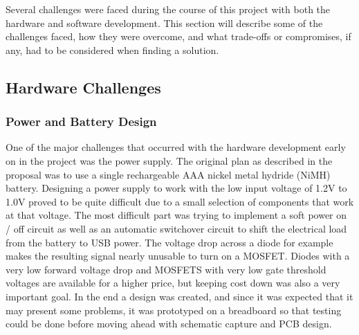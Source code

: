 Several challenges were faced during the course of this project with both the
hardware and software development. This section will describe some of the 
challenges faced, how they were overcome, and what trade-offs or compromises,
if any, had to be considered when finding a solution.

\subsection{Hardware Challenges}

\subsubsection{Power and Battery Design}

One of the major challenges that occurred with the hardware development early
on in the project was the power supply. The original plan as described in the 
proposal was to use a single rechargeable AAA nickel metal hydride (NiMH) 
battery. Designing a power supply to work with the low input voltage of 1.2V 
to 1.0V proved to be quite difficult due to a small selection of components that 
work at that voltage. The most difficult part was trying to implement a soft 
power on / off circuit as well as an automatic switchover circuit to shift the 
electrical load from the battery to USB power. The voltage drop across a diode 
for example makes the resulting signal nearly unusable to turn on a MOSFET. 
Diodes with a very low forward voltage drop and MOSFETS with very low gate 
threshold voltages are available for a higher price, but keeping cost down was 
also a very important goal. In the end a design was created, and since it was 
expected that it may present some problems, it was prototyped on a breadboard 
so that testing could be done before moving ahead with schematic capture and 
PCB design.

